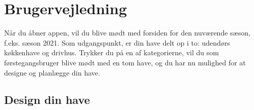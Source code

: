 \section{Brugervejledning}

Når du åbner appen, vil du blive mødt med forsiden for den nuværende sæson, f.eks. sæson 2021. Som udgangspunkt, er din have delt op i to: udendørs køkkenhave og drivhus. Trykker du på en af kategorierne, vil du som førstegangsbruger blive mødt med en tom have, og du har nu mulighed for at designe og planlægge din have.

\subsection{Design din have}

\begin{minipage}{0.4\textwidth}
\begin{figure}[H]
    \centering

\end{figure}
\end{minipage}

